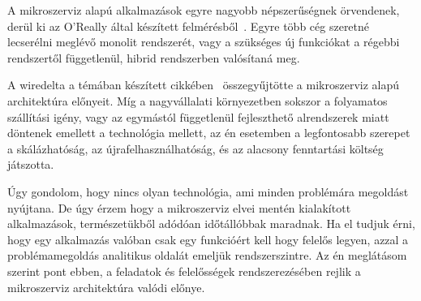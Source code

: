 A mikroszerviz alapú alkalmazások egyre nagyobb népszerűségnek örvendenek, derül ki az \foreignlanguage{british}{O'Really} által készített felmérésből~\cite{OReally}. Egyre több cég szeretné lecserélni meglévő monolit rendszerét, vagy a szükséges új funkciókat a régebbi rendszertől függetlenül, hibrid rendszerben valósítaná meg.

A \foreignlanguage{british}{wiredelta} a témában készített cikkében~\cite{wiredelta} összegyűjtötte a mikroszerviz alapú architektúra előnyeit. Míg a nagyvállalati környezetben sokszor a folyamatos szállítási igény, vagy az egymástól függetlenül fejleszthető alrendszerek miatt döntenek emellett a technológia mellett, az én esetemben a legfontosabb szerepet a skálázhatóság, az újrafelhasználhatóság, és az alacsony fenntartási költség játszotta.

Úgy gondolom, hogy nincs olyan technológia, ami minden problémára megoldást nyújtana. De úgy érzem hogy a mikroszerviz elvei mentén kialakított alkalmazások, természetükből adódóan időtállóbbak maradnak. Ha el tudjuk érni, hogy egy alkalmazás valóban csak egy funkcióért kell hogy felelős legyen, azzal a problémamegoldás analitikus oldalát  emeljük rendszerszintre. Az én meglátásom szerint pont ebben, a feladatok és felelősségek rendszerezésében rejlik a mikroszerviz architektúra valódi előnye.